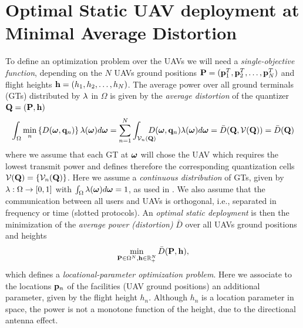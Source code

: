 \documentclass[smallabstract,smallcaptions]{dccpaper}
\newcommand{\df}{\ensuremath{\lam}}         %
\newcommand{\bH}{\ensuremath{\vh}}          %
\newcommand{\Vor}{\ensuremath{\mathcal{V}}}         %
\newcommand{\Dis}{\ensuremath{D}}                    %
\newcommand{\AvDis}{\ensuremath{\bar{\Dis}}}         %
\begin{document}
\section{Optimal Static UAV deployment at Minimal Average Distortion}

To define an optimization problem over the UAVs we will need a \emph{single-objective function}, depending   
on the $N$ UAVs ground positions $\mathbf P =({\mathbf p}_1^T,{\mathbf p}_2^T,\dots,{\mathbf p}^T_N)$ and flight heights
${\mathbf h}=(h_1,h_2,\dots,h_N)$.  The average power over all ground terminals (GTs)
distributed by $\df$ in $\Omega$ is given by the \emph{average distortion} of the quantizer $\mathbf Q=(\mathbf P ,{\mathbf h})$
%
\begin{equation}
 \int_{\Omega}\min_{n} \left\{ \Dis(\vome,\vq_n) \right\} \df(\vome)d\vome = \sum_{n=1}^N \int_{\Vor_n(\vQ)} \!\!\!\!\!\!\!D(\vome,\vq_n)\lam(\vome)d\vome=\AvDis(\vQ,\Vor(\vQ))=\AvDis(\vQ)
  \label{eq:Pbar}
\end{equation}
%
where we assume that each GT at $\boldsymbol{ \omega}$ will chose the UAV which requires the lowest transmit power and defines therefore the corresponding quantization cells $\Vor(\vQ)=\{\Vor_n(\vQ)\}$.
Here  we assume a \emph{continuous distribution} of GTs, given by $\df:\Ome\to[0,1]$ with $\int_{\Omega}\df(\vome)d\vome=1$, as
used in \cite{Erdem16,GJ,GJcom18,GJ18,Erdem1,ML,MLCS}.  We also assume that the
communication between all users and UAVs is orthogonal, i.e., separated in frequency or time (slotted protocols). An
\emph{optimal static deployment} is then the minimization of the \emph{average power (distortion)} $\AvDis$ over all UAVs ground positions and heights
\begin{align}
  \min_{\vP\in\Omega^N, \bH\in\R_+^{N}} \AvDis(\vP,\bH)\label{eq:optPbar},
\end{align}
%
which defines a \emph{locational-parameter optimization problem}.
Here we associate to the locations ${\mathbf p}_n$ of the facilities (UAV ground positions) an additional parameter, given by the
flight height $h_n$.  Although $h_n$ is a location parameter in space, the power is not a monotone function of the
height, due to the directional antenna effect.  


%
\end{document}

